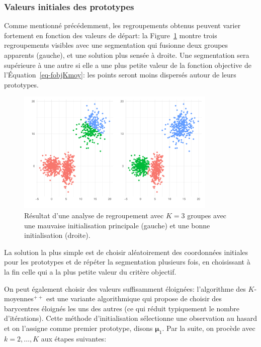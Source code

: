 \documentclass[
  11pt,
  letterpaper,
]{scrbook}
\theoremstyle{definition}
\theoremstyle{remark}
\begin{document}
\hypertarget{valeurs-initiales-des-prototypes}{%
\subsubsection*{Valeurs initiales des
prototypes}\label{valeurs-initiales-des-prototypes}}

Comme mentionné précédemment, les regroupements obtenus peuvent varier
fortement en fonction des valeurs de départ: la
Figure~\ref{fig-kmoyenne-mauvais} montre trois regroupements visibles
avec une segmentation qui fusionne deux groupes apparents (gauche), et
une solution plus sensée à droite. Une segmentation sera supérieure à
une autre si elle a une plus petite valeur de la fonction objective de
l'Équation~\ref{eq-fobjKmoy}: les points seront moins dispersés autour
de leurs prototypes.

\begin{figure}[ht!]

{\centering \includegraphics[width=0.85\textwidth,height=\textheight]{regroupements_files/figure-pdf/fig-kmoyenne-mauvais-1.pdf}

}

\caption{\label{fig-kmoyenne-mauvais}Résultat d'une analyse de
regroupement avec \(K=3\) groupes avec une mauvaise initialisation
principale (gauche) et une bonne initialisation (droite).}

\end{figure}

La solution la plus simple est de choisir aléatoirement des coordonnées
initiales pour les prototypes et de répéter la segmentation plusieurs
fois, en choisissant à la fin celle qui a la plus petite valeur du
critère objectif.

On peut également choisir des valeurs suffisamment éloignées:
l'algorithme des \(K\)-moyennes\({}^{++}\) est une variante
algorithmique qui propose de choisir des barycentres éloignés les uns
des autres (ce qui réduit typiquement le nombre d'itérations). Cette
méthode d'initialisation sélectionne une observation au hasard et on
l'assigne comme premier prototype, disons \(\boldsymbol{\mu}_1\). Par la
suite, on procède avec \(k=2, \ldots, K\) aux étapes suivantes:
\end{document}
